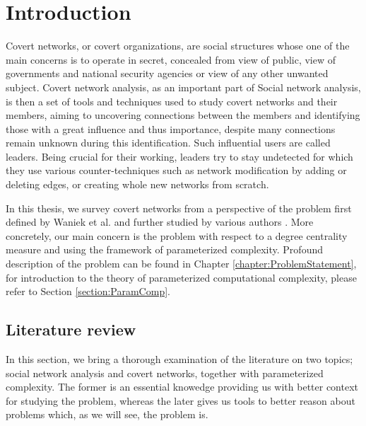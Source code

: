 \chapter*{Introduction}

\setcounter{page}{1}

Covert networks, or covert organizations, are social structures whose one of the main concerns is to operate in secret,
concealed from view of public, view of governments and national security agencies or view of any other unwanted subject.
Covert network analysis, as an important part of Social network analysis, is then a set of tools and techniques used to study
covert networks and their members, aiming to uncovering connections between the members and identifying those with a great
influence and thus importance, despite many connections remain unknown during this identification.
Such influential users are called leaders.
Being crucial for their working, leaders try to stay undetected for which they use various counter-techniques such as
network modification by adding or deleting edges, or creating whole new networks from scratch.

In this thesis, we survey covert networks from a perspective of the \HL problem first defined by
Waniek et al. \cite{Waniek2017} and further studied by various authors \cite{Dey2019,Waniek2021,Mohan2023}.
More concretely, our main concern is the \HL problem with respect to a degree centrality measure
and using the framework of parameterized complexity.
Profound description of the \HL problem can be found in Chapter \ref{chapter:ProblemStatement}, for introduction to
the theory of parameterized computational complexity, please refer to Section \ref{section:ParamComp}.


\section{Literature review}

In this section, we bring a thorough examination of the literature on two topics;
social network analysis and covert networks, together with parameterized complexity.
The former is an essential knowedge providing us with better context for studying the \HL problem, whereas
the later gives us tools to better reason about \NPh problems which, as we will see, the \HL problem is.

